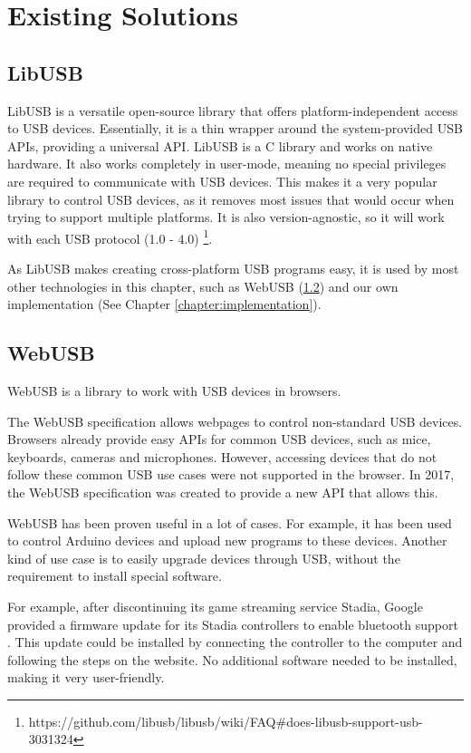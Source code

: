 \section{Existing Solutions}

\subsection{LibUSB}
\label{section:libusb}
LibUSB \cite{LibUSB} is a versatile open-source library that offers platform-independent access to USB devices. Essentially, it is a thin wrapper around the system-provided USB APIs, providing a universal API. LibUSB is a C library and works on native hardware. It also works completely in user-mode, meaning no special privileges are required to communicate with USB devices. This makes it a very popular library to control USB devices, as it removes most issues that would occur when trying to support multiple platforms. It is also version-agnostic, so it will work with each USB protocol (1.0 - 4.0) \footnote{https://github.com/libusb/libusb/wiki/FAQ\#does-libusb-support-usb-3031324}.

As LibUSB makes creating cross-platform USB programs easy, it is used by most other technologies in this chapter, such as WebUSB (\ref{section:WebUSB}) and our own implementation (See Chapter \ref{chapter:implementation}).

\subsection{WebUSB}
\label{section:WebUSB}

WebUSB \cite{WebUSB} is a library to work with USB devices in browsers.

The WebUSB specification allows webpages to control non-standard USB devices. Browsers already provide easy APIs for common USB devices, such as mice, keyboards, cameras and microphones. However, accessing devices that do not follow these common USB use cases were not supported in the browser. In 2017, the WebUSB specification was created to provide a new API that allows this.

WebUSB has been proven useful in a lot of cases. For example, it has been used to control Arduino devices and upload new programs to these devices. Another kind of use case is to easily upgrade devices through USB, without the requirement to install special software. 

For example, after discontinuing its game streaming service Stadia, Google provided a firmware update for its Stadia controllers to enable bluetooth support \cite{stadia_bluetooth_mode} \cite{stadia_bluetooth_mode_explanation}. This update could be installed by connecting the controller to the computer and following the steps on the website. No additional software needed to be installed, making it very user-friendly.

